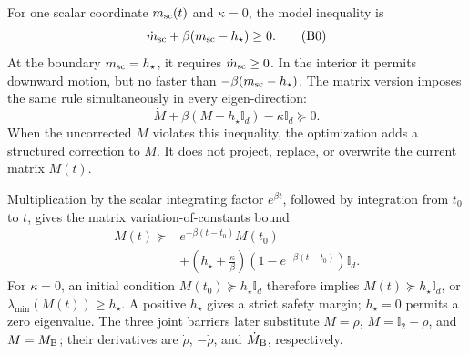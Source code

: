 \documentclass[10pt,letterpaper,twocolumn]{article}
\newcommand{\I}{\mathbb I}
\begin{document}
For one scalar coordinate \(m_{\rm sc}(t)\) and \(\kappa=0\), the model
inequality is
\[
\dot m_{\rm sc}+\beta(m_{\rm sc}-h_\star)\geq0.
\tag{B0}
\]
At the boundary \(m_{\rm sc}=h_\star\), it requires
\(\dot m_{\rm sc}\geq0\).  In the interior it permits downward motion, but no
faster than \(-\beta(m_{\rm sc}-h_\star)\).  The matrix version imposes the
same rule simultaneously in every eigen-direction:
\[
\dot M+\beta(M-h_\star\I_d)-\kappa\I_d\succeq0.
\tag{B1}
\]
When the uncorrected \(\dot M\) violates this inequality, the optimization
adds a structured correction to \(\dot M\).  It does not project, replace, or
overwrite the current matrix \(M(t)\).

Multiplication by the scalar integrating factor \(e^{\beta t}\), followed by
integration from \(t_0\) to \(t\), gives the matrix
variation-of-constants bound
\[
\begin{aligned}
M(t)\succeq{}&e^{-\beta(t-t_0)}M(t_0)\\
&+\left(h_\star+\frac{\kappa}{\beta}\right)
\left(1-e^{-\beta(t-t_0)}\right)\I_d.
\end{aligned}
\tag{B2}
\]
For \(\kappa=0\), an initial condition
\(M(t_0)\succeq h_\star\I_d\) therefore implies
\(M(t)\succeq h_\star\I_d\), or
\(\lambda_{\min}(M(t))\geq h_\star\).  A positive \(h_\star\) gives a strict
safety margin; \(h_\star=0\) permits a zero eigenvalue.  The three joint
barriers later substitute \(M=\rho\), \(M=\I_2-\rho\), and
\(M=M_{\rm B}\); their derivatives are \(\dot\rho\), \(-\dot\rho\), and
\(\dot M_{\rm B}\), respectively.
\end{document}
